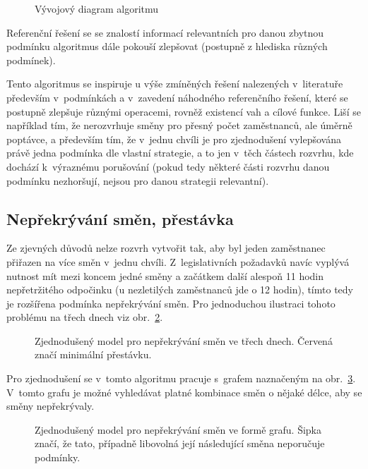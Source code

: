 \documentclass[twoside]{ctuthesis}
\begin{document}
\begin{figure}
	
	\caption{Vývojový diagram algoritmu}
	\label{fig:algorithmflow}
\end{figure}

Referenční řešení se se znalostí informací relevantních pro danou zbytnou podmínku algoritmus dále pokouší zlepšovat (postupně z hlediska různých podmínek).

Tento algoritmus se inspiruje u výše zmíněných řešení nalezených v~literatuře především v~podmínkách a v~zavedení náhodného referenčního řešení, které se postupně zlepšuje různými operacemi, rovněž existencí vah a cílové funkce. Liší se například tím, že nerozvrhuje směny pro přesný počet zaměstnanců, ale úměrně poptávce, a především tím, že v~jednu chvíli je pro zjednodušení vylepšována právě jedna podmínka dle vlastní strategie, a to jen v~těch částech rozvrhu, kde dochází k~výraznému porušování (pokud tedy některé části rozvrhu danou podmínku nezhoršují, nejsou pro danou strategii relevantní).

\subsection{Nepřekrývání směn, přestávka}
Ze zjevných důvodů nelze rozvrh vytvořit tak, aby byl jeden zaměstnanec přiřazen na více směn v~jednu chvíli. Z~legislativních požadavků navíc vyplývá nutnost mít mezi koncem jedné směny a začátkem další alespoň 11 hodin nepřetržitého odpočinku (u nezletilých zaměstnanců jde o 12 hodin), tímto tedy je rozšířena podmínka nepřekrývání směn. Pro jednoduchou ilustraci tohoto problému na třech dnech viz obr.~\ref{fig:shiftprecedencefull}.

\begin{figure}[h!]
	
	\caption{Zjednodušený model pro nepřekrývání směn ve třech dnech. Červená značí minimální přestávku.}
	\label{fig:shiftprecedencefull}
\end{figure}

Pro zjednodušení se v~tomto algoritmu pracuje s~grafem naznačeným na obr.~\ref{fig:shiftprecedence}. V~tomto grafu je možné vyhledávat platné kombinace směn o nějaké délce, aby se směny nepřekrývaly.

\begin{figure}[h!]
	
	\caption{Zjednodušený model pro nepřekrývání směn ve formě grafu. Šipka značí, že tato, případně libovolná její následující směna neporučuje podmínky.}
	\label{fig:shiftprecedence}
\end{figure}
\end{document}
